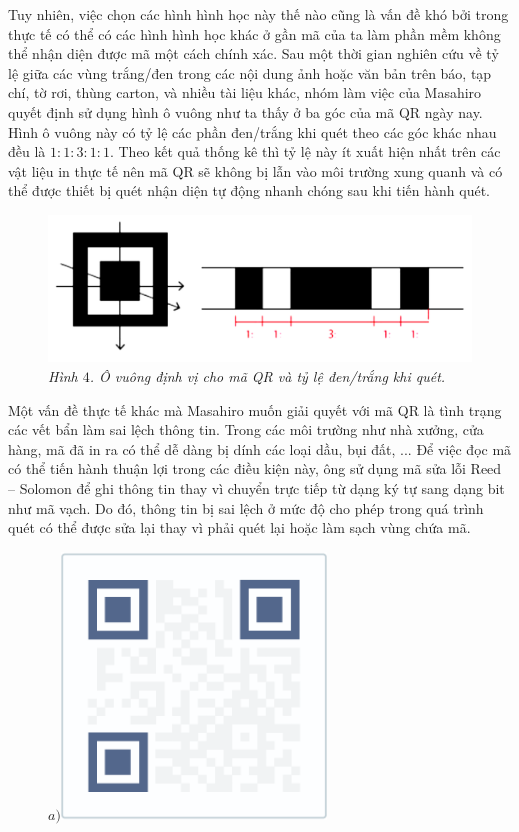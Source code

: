 \begin{multicols}{2}
	\vskip 0.05cm
	Tuy nhiên, việc chọn các hình hình học này thế nào cũng là vấn đề khó bởi trong thực tế có thể có các hình hình học khác ở gần mã của ta làm phần mềm không thể nhận diện được mã một cách chính xác. Sau một thời gian nghiên cứu về tỷ lệ giữa các vùng trắng/đen trong các nội dung  ảnh hoặc văn bản trên báo, tạp chí, tờ rơi, thùng carton, và nhiều tài liệu khác, nhóm làm việc của Masahiro quyết định sử dụng hình ô vuông như ta thấy ở ba góc của mã QR ngày nay. Hình ô vuông này có tỷ lệ các phần đen/trắng khi quét theo các góc khác nhau đều là $1 : 1 : 3 : 1 : 1$. Theo kết quả thống kê thì tỷ lệ này ít xuất hiện nhất trên các vật liệu in thực tế nên mã QR sẽ không bị lẫn vào môi trường xung quanh và có thể được thiết bị quét nhận diện tự động nhanh chóng sau khi tiến hành quét.
	\begin{figure}[H]
		\vspace*{-10pt}
		\centering
		\captionsetup{labelformat= empty, justification=centering}
		\includegraphics[width=1\linewidth]{6}
		\caption{\small\textit{\color{toanhocdoisong}Hình $4$. Ô vuông định vị cho mã QR và tỷ lệ đen/trắng khi quét.}}
		\vspace*{-10pt}
	\end{figure}
	Một vấn đề thực tế khác mà Masahiro muốn giải quyết với mã QR là tình trạng các vết bẩn làm sai lệch thông tin. Trong các môi trường như nhà xưởng, cửa hàng, mã đã in ra có thể dễ dàng bị dính các loại dầu, bụi đất, ... Để việc đọc mã có thể tiến hành thuận lợi trong các điều kiện này, ông sử dụng mã sửa lỗi Reed -- Solomon để ghi thông tin thay vì chuyển trực tiếp từ dạng ký tự sang dạng bit như mã vạch. Do đó, thông tin bị sai lệch ở mức độ cho phép trong quá trình quét có thể được sửa lại thay vì phải quét lại hoặc làm sạch vùng chứa mã.
	\begin{figure}[H]
		\vspace*{-5pt}
		\centering
		\captionsetup{labelformat= empty, justification=centering}
		$a)$\includegraphics[height=0.35\linewidth]{7}

\end{figure}
\end{multicols}
